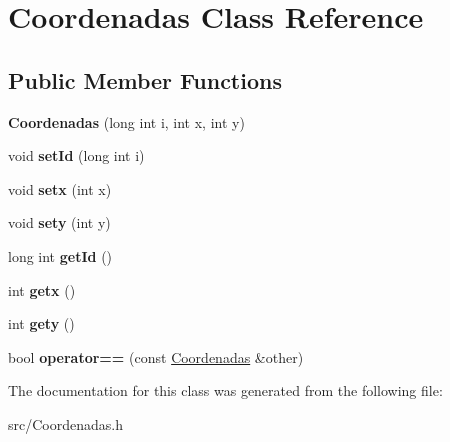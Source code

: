 \hypertarget{class_coordenadas}{}\section{Coordenadas Class Reference}
\label{class_coordenadas}
\subsection*{Public Member Functions}
\begin{DoxyCompactItemize}
\item 
\hypertarget{class_coordenadas_a46b67d7f01481627bd4eb8f14b099e6d}{}\label{class_coordenadas_a46b67d7f01481627bd4eb8f14b099e6d} 
{\bfseries Coordenadas} (long int i, int x, int y)
\item 
\hypertarget{class_coordenadas_aa78d8ae416a5623fe3ae9a38650ac3b3}{}\label{class_coordenadas_aa78d8ae416a5623fe3ae9a38650ac3b3} 
void {\bfseries set\+Id} (long int i)
\item 
\hypertarget{class_coordenadas_ac200d3ab224a8c1f611401b0c3488db1}{}\label{class_coordenadas_ac200d3ab224a8c1f611401b0c3488db1} 
void {\bfseries setx} (int x)
\item 
\hypertarget{class_coordenadas_a1281734232f9d81721056fb39e5442db}{}\label{class_coordenadas_a1281734232f9d81721056fb39e5442db} 
void {\bfseries sety} (int y)
\item 
\hypertarget{class_coordenadas_ae43e121aac86110fab683c33dd4f6604}{}\label{class_coordenadas_ae43e121aac86110fab683c33dd4f6604} 
long int {\bfseries get\+Id} ()
\item 
\hypertarget{class_coordenadas_ae6ea0dca6046a497d671d9178ab520e1}{}\label{class_coordenadas_ae6ea0dca6046a497d671d9178ab520e1} 
int {\bfseries getx} ()
\item 
\hypertarget{class_coordenadas_ab29035946a67a11fc7de773c3a4ee6e9}{}\label{class_coordenadas_ab29035946a67a11fc7de773c3a4ee6e9} 
int {\bfseries gety} ()
\item 
\hypertarget{class_coordenadas_a339a889919a6dfde1136093f51c34175}{}\label{class_coordenadas_a339a889919a6dfde1136093f51c34175} 
bool {\bfseries operator==} (const \hyperlink{class_coordenadas}{Coordenadas} \&other)
\end{DoxyCompactItemize}


The documentation for this class was generated from the following file\+:\begin{DoxyCompactItemize}
\item 
src/Coordenadas.\+h\end{DoxyCompactItemize}
